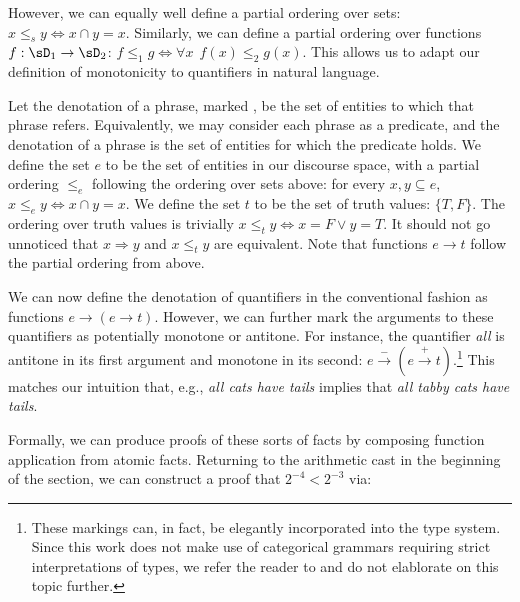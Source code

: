 However, we can equally well define a partial ordering over sets:
  $x \le_s y \Leftrightarrow x \cap y = x$.
Similarly, we can define a partial ordering over functions
  $f : \sD_1 \rightarrow \sD_2$:
  $f \le_1 g \Leftrightarrow \forall x ~~ f(x) \leq_2 g(x)$.
This allows us to adapt our definition of monotonicity to quantifiers
  in natural language.

Let the denotation of a phrase, marked \denote{\cdot}, be the set of
  entities to which that phrase refers.
Equivalently, we may consider each phrase as a predicate, and the denotation
  of a phrase is the set of entities for which the predicate holds.
We define the set $e$ to be the set of entities in our discourse space,
  with a partial ordering $\le_e$ following the ordering over sets
  above: for every $x,y \subseteq e$, $x \le_e y \Leftrightarrow x \cap y = x$.
We define the set $t$ to be the set of truth values: $\{T, F\}$.
The ordering over truth values is trivially
  $x \le_t y \Leftrightarrow x = F \lor y = T$.
It should not go unnoticed that $x \Rightarrow y$ and $x \le_t y$ 
  are equivalent.
Note that functions $e \rightarrow t$ follow the partial ordering from
  above.

We can now define the denotation of quantifiers in the conventional
  fashion as functions $e \rightarrow (e \rightarrow t)$.
However, we can further mark the arguments to these quantifiers as
  potentially monotone or antitone.
For instance, the quantifier \textit{all} is antitone in its first
  argument and monotone in its second:
  $e \xrightarrow{-} (e \xrightarrow{+} t)$.\footnote{
    These markings can, in fact, be elegantly incorporated into the
    type system. Since this work does not make use of categorical
    grammars requiring strict interpretations of types, we refer the
    reader to  and do not elablorate
    on this topic further.
  }
This matches our intuition that, e.g., \textit{all cats have tails}
  implies that \textit{all tabby cats have tails}.

Formally, we can produce proofs of these sorts of facts by composing
  function application from atomic facts.
Returning to the arithmetic cast in the beginning of the section, we
  can construct a proof that $2^{-4} < 2^{-3}$ via:

\begin{prooftree}
\end{prooftree}

